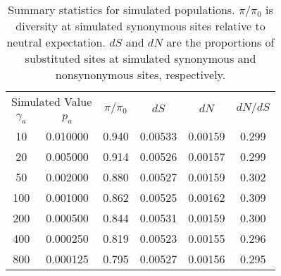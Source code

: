 
\begin{table}[h!]
   \centering
   \begin{threeparttable}[b]
\caption{Summary statistics for simulated populations. $\pi / \pi_0$ is diversity at simulated synonymous sites relative to neutral expectation. $dS$ and $dN$ are the proportions of substituted sites at simulated synonymous and nonsynonymous sites, respectively.}

\begin{tabular}{cccccc}
\toprule 
 \multicolumn{2}{c}{Simulated Value} &  \multirow{2}{*}{$\pi / \pi_0$} &  \multirow{2}{*}{$dS$} &  \multirow{2}{*}{$dN$} &  \multirow{2}{*}{$dN/dS$}     \\ \cline{1-2}
 $\gamma_a$ &       $p_a$ & & & &      \\
\midrule
       10 &  0.010000 &  0.940 &  0.00533 &  0.00159 &  0.299 \\
      20 &  0.005000 &  0.914 &  0.00526 &  0.00157 &  0.299 \\
      50 &  0.002000 &  0.880 &  0.00527 &  0.00159 &  0.302 \\
      100 &  0.001000 &  0.862 &  0.00525 &  0.00162 &  0.309 \\
     200 &  0.000500 &  0.844 &  0.00531 &  0.00159 &  0.300 \\
     400 &  0.000250 &  0.819 &  0.00523 &  0.00155 &  0.296 \\
     800 &  0.000125 &  0.795 &  0.00527 &  0.00156 &  0.295 \\
\bottomrule
\end{tabular}
\label{tab:summaryStats}

   \end{threeparttable}

   \end{table}
